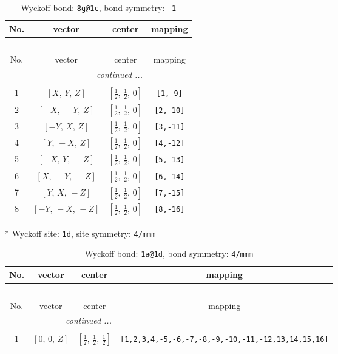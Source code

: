 \documentclass[fleqn,8pt]{jsarticle}
\begin{document}
\begin{longtable}{cccc}
\caption{Wyckoff bond: {\tt 8g@1c}, bond symmetry: {\tt -1}}
 \\
 \hline \hline
No. & vector & center & mapping \\ \hline \endfirsthead

\multicolumn{3}{l}{\tablename\ \thetable{}} \\
 \hline \hline
No. & vector & center & mapping \\ \hline \endhead

 \hline \hline
\multicolumn{3}{r}{\footnotesize\it continued ...} \\ \endfoot

 \hline \hline
\multicolumn{3}{r}{} \\ \endlastfoot

1 & $\left[ X,\, Y,\, Z \right]$ & $\left[ \frac{1}{2},\, \frac{1}{2},\, 0 \right]$ & {\tt [1,-9]} \\ \hline
2 & $\left[ - X,\, - Y,\, Z \right]$ & $\left[ \frac{1}{2},\, \frac{1}{2},\, 0 \right]$ & {\tt [2,-10]} \\ \hline
3 & $\left[ - Y,\, X,\, Z \right]$ & $\left[ \frac{1}{2},\, \frac{1}{2},\, 0 \right]$ & {\tt [3,-11]} \\ \hline
4 & $\left[ Y,\, - X,\, Z \right]$ & $\left[ \frac{1}{2},\, \frac{1}{2},\, 0 \right]$ & {\tt [4,-12]} \\ \hline
5 & $\left[ - X,\, Y,\, - Z \right]$ & $\left[ \frac{1}{2},\, \frac{1}{2},\, 0 \right]$ & {\tt [5,-13]} \\ \hline
6 & $\left[ X,\, - Y,\, - Z \right]$ & $\left[ \frac{1}{2},\, \frac{1}{2},\, 0 \right]$ & {\tt [6,-14]} \\ \hline
7 & $\left[ Y,\, X,\, - Z \right]$ & $\left[ \frac{1}{2},\, \frac{1}{2},\, 0 \right]$ & {\tt [7,-15]} \\ \hline
8 & $\left[ - Y,\, - X,\, - Z \right]$ & $\left[ \frac{1}{2},\, \frac{1}{2},\, 0 \right]$ & {\tt [8,-16]} \\
\end{longtable}
* Wyckoff site: {\tt 1d}, site symmetry: {\tt 4/mmm}
\renewcommand{\arraystretch}{1.2}
\begin{longtable}{cccc}
\caption{Wyckoff bond: {\tt 1a@1d}, bond symmetry: {\tt 4/mmm}}
 \\
 \hline \hline
No. & vector & center & mapping \\ \hline \endfirsthead

\multicolumn{3}{l}{\tablename\ \thetable{}} \\
 \hline \hline
No. & vector & center & mapping \\ \hline \endhead

 \hline \hline
\multicolumn{3}{r}{\footnotesize\it continued ...} \\ \endfoot

 \hline \hline
\multicolumn{3}{r}{} \\ \endlastfoot

1 & $\left[ 0,\, 0,\, Z \right]$ & $\left[ \frac{1}{2},\, \frac{1}{2},\, \frac{1}{2} \right]$ & {\tt [1,2,3,4,-5,-6,-7,-8,-9,-10,-11,-12,13,14,15,16]} \\
\end{longtable}
\end{document}
